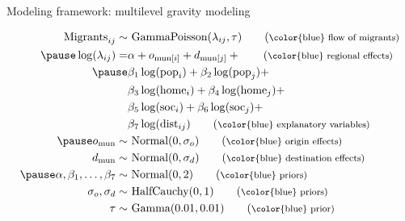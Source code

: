 \documentclass{beamer}
\begin{document}
\begin{frame}[fragile]{Modeling framework: multilevel gravity modeling}
\begin{small}
	\begin{align} \text{Migrants}_{ij} \sim & \text{ GammaPoisson}(\lambda_{ij}, \tau) \tag{\footnotesize \color{blue} flow of migrants} \\ \pause
	\log(\lambda_{ij}) =
	& \alpha + o_{\text{mun}[i]} + d_{\text{mun}[j]} + \tag{\footnotesize \color{blue} regional effects}  \\ \pause
	& \beta_1 \log(\text{pop}_i) + \notag
	\beta_2\log(\text{pop}_j) + \notag \\ & \beta_3
	\log(\text{home}_i) + \beta_4 \log(\text{home}_j) + \notag\\
	& \beta_5 \log(\text{soc}_i) + \beta_6 \log(\text{soc}_j) + \notag \\ 
	& \beta_7 \log(\text{dist}_{ij})  \tag{\footnotesize \color{blue} explanatory variables}  \\ \pause
	o_{\text{mun}} \sim& \text{ Normal}(0, \sigma_o)  \tag{\footnotesize \color{blue} origin effects}  \\ 
	d_{\text{mun}} \sim& \text{ Normal}(0, \sigma_d)   \tag{\footnotesize \color{blue} destination effects}  \\ \pause
	\alpha, \beta_1,\ldots, \beta_7 \sim& \text{
		Normal}(0,2) \tag{\footnotesize \color{blue} priors} \\ 
	\sigma_o, \sigma_d \sim& \text{ HalfCauchy}(0,1) \tag{\footnotesize \color{blue} priors}  \\ 
	\tau \sim& \text{ Gamma}(0.01, 0.01)  \tag{\footnotesize \color{blue} prior}  
	\end{align}
\end{small}
\end{frame}
\end{document}
